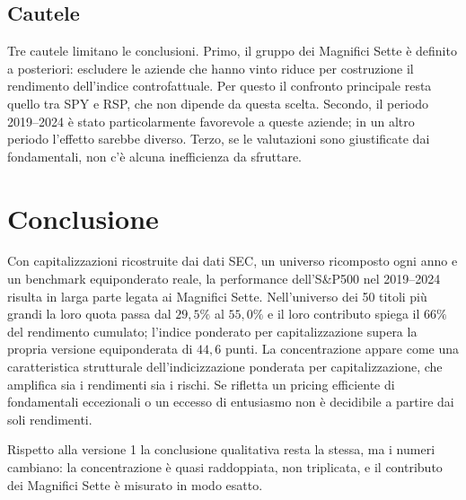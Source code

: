 \documentclass[12pt, a4paper]{article}
\begin{document}
\subsection{Cautele}

Tre cautele limitano le conclusioni. Primo, il gruppo dei Magnifici Sette \`e definito a posteriori: escludere le aziende che hanno vinto riduce per costruzione il rendimento dell'indice controfattuale. Per questo il confronto principale resta quello tra SPY e RSP, che non dipende da questa scelta. Secondo, il periodo 2019--2024 \`e stato particolarmente favorevole a queste aziende; in un altro periodo l'effetto sarebbe diverso. Terzo, se le valutazioni sono giustificate dai fondamentali, non c'\`e alcuna inefficienza da sfruttare.

\section{Conclusione}

Con capitalizzazioni ricostruite dai dati SEC, un universo ricomposto ogni anno e un benchmark equiponderato reale, la performance dell'S\&P500 nel 2019--2024 risulta in larga parte legata ai Magnifici Sette. Nell'universo dei 50 titoli pi\`u grandi la loro quota passa dal $29{,}5\%$ al $55{,}0\%$ e il loro contributo spiega il $66\%$ del rendimento cumulato; l'indice ponderato per capitalizzazione supera la propria versione equiponderata di $44{,}6$ punti. La concentrazione appare come una caratteristica strutturale dell'indicizzazione ponderata per capitalizzazione, che amplifica sia i rendimenti sia i rischi. Se rifletta un pricing efficiente di fondamentali eccezionali o un eccesso di entusiasmo non \`e decidibile a partire dai soli rendimenti.

Rispetto alla versione 1 la conclusione qualitativa resta la stessa, ma i numeri cambiano: la concentrazione \`e quasi raddoppiata, non triplicata, e il contributo dei Magnifici Sette \`e misurato in modo esatto.



\end{document}
